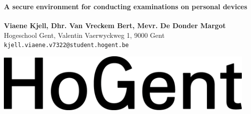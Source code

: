 \documentclass[a0,portrait]{a0poster}
\begin{document}


\begin{minipage}[t]{0.75\linewidth}
\VeryHuge \color{HoGentAccent1} \textbf{A secure environment for conducting examinations on personal devices} \color{Black}\\ %
\Huge\textit{}\\[2.4cm] %
\huge \textbf{Viaene Kjell, Dhr. Van Vreckem Bert, Mevr. De Donder Margot}\\[0.5cm] %
\huge Hogeschool Gent, Valentin Vaerwyckweg 1, 9000 Gent\\[0.4cm] %
\Large \texttt{kjell.viaene.v7322@student.hogent.be} \\
\end{minipage}
%
\begin{minipage}[t]{0.25\linewidth}
\includegraphics[width=13cm,right]{figures/HG-woordmerk.jpg} 

\end{minipage}

\vspace{1cm} %

\end{document}

